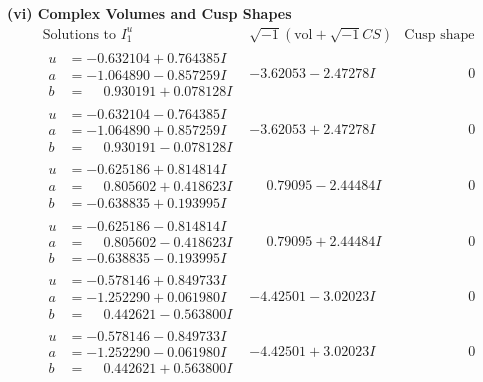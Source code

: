 \documentclass[1p]{elsarticle_modified}
\theoremstyle{definition}
\newcommand{\I}{\sqrt{-1}}
\begin{document}
\newpage\flushleft \textbf{(vi) Complex Volumes and Cusp Shapes}
$$\begin{array}{c|c|c}  
\text{Solutions to }I^u_{1}& \I (\text{vol} + \sqrt{-1}CS) & \text{Cusp shape}\\
 \hline 
\begin{aligned}
u &= -0.632104 + 0.764385 I \\
a &= -1.064890 - 0.857259 I \\
b &= \phantom{-}0.930191 + 0.078128 I\end{aligned}
 & -3.62053 - 2.47278 I & \phantom{-0.000000 } 0 \\ \hline\begin{aligned}
u &= -0.632104 - 0.764385 I \\
a &= -1.064890 + 0.857259 I \\
b &= \phantom{-}0.930191 - 0.078128 I\end{aligned}
 & -3.62053 + 2.47278 I & \phantom{-0.000000 } 0 \\ \hline\begin{aligned}
u &= -0.625186 + 0.814814 I \\
a &= \phantom{-}0.805602 + 0.418623 I \\
b &= -0.638835 + 0.193995 I\end{aligned}
 & \phantom{-}0.79095 - 2.44484 I & \phantom{-0.000000 } 0 \\ \hline\begin{aligned}
u &= -0.625186 - 0.814814 I \\
a &= \phantom{-}0.805602 - 0.418623 I \\
b &= -0.638835 - 0.193995 I\end{aligned}
 & \phantom{-}0.79095 + 2.44484 I & \phantom{-0.000000 } 0 \\ \hline\begin{aligned}
u &= -0.578146 + 0.849733 I \\
a &= -1.252290 + 0.061980 I \\
b &= \phantom{-}0.442621 - 0.563800 I\end{aligned}
 & -4.42501 - 3.02023 I & \phantom{-0.000000 } 0 \\ \hline\begin{aligned}
u &= -0.578146 - 0.849733 I \\
a &= -1.252290 - 0.061980 I \\
b &= \phantom{-}0.442621 + 0.563800 I\end{aligned}
 & -4.42501 + 3.02023 I & \phantom{-0.000000 } 0 \\ \hline\begin{aligned}

\end{aligned}
\end{array}$$
\end{document}
